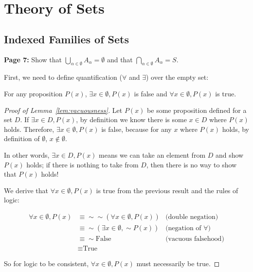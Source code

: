 \chapter{Theory of Sets}

\setcounter{section}{3} %
\section{Indexed Families of Sets}

\textbf{Page 7:} Show that $\bigcup_{\alpha \in \emptyset} A_\alpha = \emptyset$ and that $\bigcap_{\alpha \in \emptyset} A_\alpha = S$.

First, we need to define quantification ($\forall$ and $\exists$) over the empty set:

\begin{lemma} \label{lem:vacuousness}
	For any proposition $P(x)$, $\exists x \in \emptyset, P(x)$ is false and $\forall x \in \emptyset, P(x)$ is true.
\end{lemma}

\begin{proof}[Proof of Lemma~\ref{lem:vacuousness}]
	Let $P(x)$ be some proposition defined for a set $D$.
	If $\exists x \in D, P(x)$, by definition we know there is some $x \in D$ where $P(x)$ holds.
	Therefore, $\exists x \in \emptyset, P(x)$ is false, because for any $x$ where $P(x)$ holds, by definition of $\emptyset$, $x \notin \emptyset$.

	In other words, $\exists x \in D, P(x)$ means we can take an element from $D$ and show $P(x)$ holds; if there is nothing to take from $D$,
	then there is no way to show that $P(x)$ holds!

	We derive that $\forall x \in \emptyset, P(x)$ is true from the previous result and the rules of logic:

	\begin{align*}
		\forall x \in \emptyset, P(x) &\equiv \sim \sim (\forall x \in \emptyset, P(x)) & \text{(double negation)}\\
		&\equiv \sim (\exists x \in \emptyset, \sim P(x)) & \text{(negation of $\forall$)}\\
		&\equiv \sim \text{False} & \text{(vacuous falsehood)}\\
		&\equiv \text{True}
	\end{align*}

	So for logic to be consistent, $\forall x \in \emptyset, P(x)$ must necessarily be true.
\end{proof}

